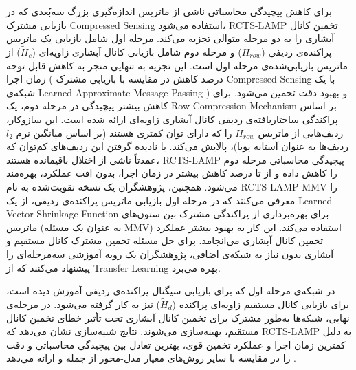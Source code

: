 	برای کاهش پیچیدگی محاسباتی ناشی از ماتریس اندازه‌گیری بزرگ سه‌بُعدی که در بازیابی مشترک 
\gls{Compressed Sensing}
	استفاده می‌شود، 
\gls{RCTS-LAMP}
	 تخمین کانال آبشاری را به دو مرحله متوالی تجزیه می‌کند. مرحله اول شامل بازیابی یک ماتریس پراکنده‌ی ردیفی
($H_{row}$)
	 و مرحله دوم شامل بازیابی کانال آبشاری زاویه‌ای 
($\tilde{H}_c$) 
	از ماتریس بازیابی‌شده‌ی مرحله اول است. این تجزیه به تنهایی منجر به کاهش قابل توجه زمان اجرا (
	 درصد کاهش در مقایسه با بازیابی مشترک 
\gls{Compressed Sensing}
	  با یک شبکه‌ی 
\gls{Learned Approximate Message Passing}
	  ) و بهبود دقت تخمین می‌شود.
	برای کاهش بیشتر پیچیدگی در مرحله دوم، یک 
\gls{Row Compression Mechanism}
	 بر اساس پراکندگی ساختاریافته‌ی ردیفی کانال آبشاری زاویه‌ای ارائه شده است. این سازوکار، ردیف‌هایی از ماتریس 
$H_{row}$
	را که دارای توان کمتری هستند (بر اساس میانگین نرم 
$l_2$
	ردیف‌ها به عنوان آستانه پویا)، پالایش می‌کند. با نادیده گرفتن این ردیف‌های کم‌توان که عمدتاً ناشی از اختلال باقیمانده هستند، 
\gls{RCTS-LAMP}
	 پیچیدگی محاسباتی مرحله دوم را کاهش داده و از 
	  تا 
	   درصد کاهش بیشتر در زمان اجرا، بدون افت عملکرد، بهره‌مند می‌شود.
	همچنین، پژوهشگران یک نسخه تقویت‌شده به نام 
\gls{RCTS-LAMP-MMV}
	 را معرفی می‌کنند که در مرحله اول بازیابی ماتریس پراکنده‌ی ردیفی، از یک  
\gls{Learned Vector Shrinkage Function}
	  برای بهره‌برداری از پراکندگی مشترک بین ستون‌های ماتریس (به عنوان یک مسئله 
\gls{MMV})
	   استفاده می‌کند. این کار به بهبود بیشتر عملکرد تخمین کانال آبشاری می‌انجامد.
	برای حل مسئله تخمین مشترک کانال مستقیم و آبشاری بدون نیاز به شبکه‌ی اضافی، پژوهشگران یک رویه آموزشی سه‌مرحله‌ای را پیشنهاد می‌کنند که از 
\gls{Transfer Learning}
	بهره می‌برد.
	
	در شبکه‌ی 
	مرحله اول که برای بازیابی سیگنال پراکنده‌ی ردیفی آموزش دیده است، برای بازیابی کانال مستقیم زاویه‌ای پراکنده 
($\tilde{H}_d$) 
نیز به کار گرفته می‌شود. در مرحله‌ی نهایی، شبکه‌ها به‌طور مشترک برای تخمین کانال آبشاری تحت تأثیر خطای تخمین کانال مستقیم، بهینه‌سازی می‌شوند. نتایج شبیه‌سازی نشان می‌دهد که 
\gls{RCTS-LAMP}
 به دلیل کمترین زمان اجرا و عملکرد تخمین قوی، بهترین تعادل بین پیچیدگی محاسباتی و دقت را در مقایسه با سایر روش‌های معیار مدل-محور از جمله 
  و 
  ارائه می‌دهد
\cite{DeepUnfoldingBased}.
